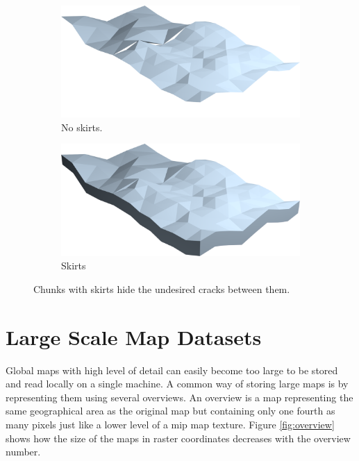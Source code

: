\begin{figure}[htbp]
    \centering
    \begin{subfigure}[bt]{0.4\textwidth}
        \includegraphics[width=\textwidth]{figures/chunkedlod/skirts_without.png}
        \caption{No skirts.}
    \end{subfigure}
    \begin{subfigure}[bt]{0.4\textwidth}
        \includegraphics[width=\textwidth]{figures/chunkedlod/skirts_with.png}
        \caption{Skirts}
    \end{subfigure}
    \caption{Chunks with skirts hide the undesired cracks between them.}
    \label{fig:skirts}
\end{figure}

\section{Large Scale Map Datasets}

Global maps with high level of detail can easily become too large to be stored and read locally on a single machine. A common way of storing large maps is by representing them using several overviews. An overview is a map representing the same geographical area as the original map but containing only one fourth as many pixels just like a lower level of a mip map texture. Figure \ref{fig:overview} shows how the size of the maps in raster coordinates decreases with the overview number.

